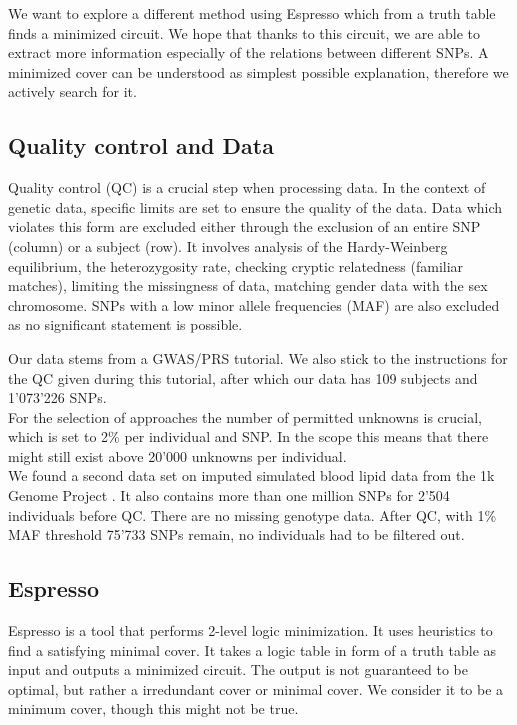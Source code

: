 \documentclass[letterpaper, 11pt]{article}
\begin{document}
We want to explore a different method using Espresso which from a truth table finds a minimized circuit. We hope that thanks to this circuit, we are able to extract more information especially of the relations between different SNPs. A minimized cover can be understood as simplest possible explanation, therefore we actively search for it. 

\subsection {Quality control and Data}
Quality control (QC) is a crucial step when processing data\cite{QC}. In the context of genetic data, specific limits are set to ensure the quality of the data. Data which violates this form are excluded either through the exclusion of an entire SNP (column) or a subject (row). It involves analysis of the Hardy-Weinberg equilibrium, the heterozygosity rate, checking cryptic relatedness (familiar matches), limiting the missingness of data, matching gender data with the sex chromosome. SNPs with a low minor allele frequencies (MAF) are also excluded as no significant statement is possible. 

Our data stems from a GWAS/PRS tutorial\cite{tutorial}. We also stick to the instructions for the QC given during this tutorial, after which our data has 109 subjects and 1'073'226 SNPs.  \\

For the selection of approaches the number of permitted unknowns is crucial, which is set to 2\% per individual and SNP. In the scope this means that there might still exist above 20'000 unknowns per individual. \\

We found a second data set on imputed simulated blood lipid data from the 1k Genome Project \cite{1k}. It also contains more than one million SNPs for 2'504 individuals before QC. There are no missing genotype data. After QC, with 1\% MAF threshold 75'733 SNPs remain, no individuals had to be filtered out.\\

\subsection{Espresso}
Espresso is a tool that performs 2-level logic minimization. It uses heuristics to find a satisfying minimal cover. It takes a logic table in form of a truth table as input and outputs a minimized circuit.  The output is not guaranteed to be optimal, but rather a irredundant cover or minimal cover. We consider it to be a minimum cover, though this might not be true.  \\
\end{document}
